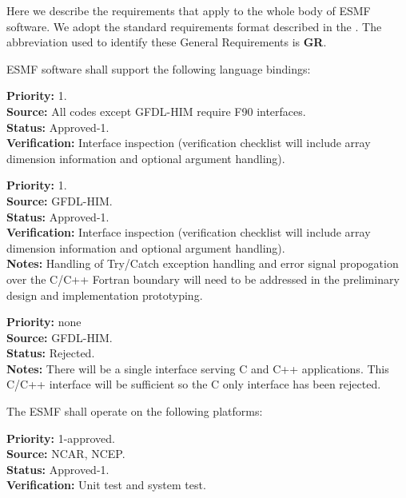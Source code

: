 
Here we describe the requirements that apply to the whole body of 
ESMF software.  We adopt the standard requirements format described in 
the .  The abbreviation used to identify
these General Requirements is {\bf GR}.


ESMF software shall support the following language bindings:

\begin{reqlist}
{\bf Priority:} 1. \\
{\bf Source:} All codes except GFDL-HIM require F90 interfaces. \\
{\bf Status:} Approved-1. \\
{\bf Verification:} Interface inspection (verification
  checklist will include array dimension information and 
  optional argument handling).
\end{reqlist}

\begin{reqlist}
{\bf Priority:} 1. \\
{\bf Source:} GFDL-HIM. \\
{\bf Status:} Approved-1. \\
{\bf Verification:} Interface inspection (verification
  checklist will include array dimension information and 
  optional argument handling).\\
{\bf Notes:} Handling of Try/Catch exception handling and 
error signal propogation over the C/C++ Fortran boundary 
will need to be addressed in the preliminary design and
implementation prototyping.
\end{reqlist}

\begin{reqlist}
  {\bf Priority:} none \\
  {\bf Source:} GFDL-HIM. \\
  {\bf Status:} Rejected. \\
  {\bf Notes:} There will be a single interface serving C and C++
  applications. This C/C++ interface will be sufficient so the C only
  interface has been rejected.
\end{reqlist}

The ESMF shall operate on the following platforms:

\begin{reqlist}
{\bf Priority:} 1-approved. \\
{\bf Source:} NCAR, NCEP. \\
{\bf Status:} Approved-1. \\
{\bf Verification:} Unit test and system test.
\end{reqlist}

